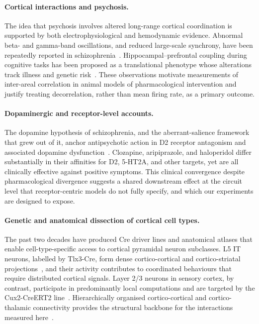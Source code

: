 \documentclass[11pt]{article}
\begin{document}
\paragraph{Cortical interactions and psychosis.}
The idea that psychosis involves altered long-range cortical coordination is supported by both electrophysiological and hemodynamic evidence. Abnormal beta- and gamma-band oscillations, and reduced large-scale synchrony, have been repeatedly reported in schizophrenia~\citep{uhlhaas2015oscillations, uhlhaas2013highfrequency}. Hippocampal--prefrontal coupling during cognitive tasks has been proposed as a translational phenotype whose alterations track illness and genetic risk~\citep{bahner2017hippocampal}. These observations motivate measurements of inter-areal correlation in animal models of pharmacological intervention and justify treating decorrelation, rather than mean firing rate, as a primary outcome.

\paragraph{Dopaminergic and receptor-level accounts.}
The dopamine hypothesis of schizophrenia, and the aberrant-salience framework that grew out of it, anchor antipsychotic action in D2 receptor antagonism and associated dopamine dysfunction~\citep{howes2009dopamine, kambeitz2014alterations}. Clozapine, aripiprazole, and haloperidol differ substantially in their affinities for D2, 5-HT2A, and other targets, yet are all clinically effective against positive symptoms. This clinical convergence despite pharmacological divergence suggests a shared downstream effect at the circuit level that receptor-centric models do not fully specify, and which our experiments are designed to expose.

\paragraph{Genetic and anatomical dissection of cortical cell types.}
The past two decades have produced Cre driver lines and anatomical atlases that enable cell-type-specific access to cortical pyramidal neuron subclasses. L5 IT neurons, labelled by Tlx3-Cre, form dense cortico-cortical and cortico-striatal projections~\citep{liu2024celltype, matho2021genetic, biccn2021multimodal, shinotsuka2023layer5, atudorei2024bilateral}, and their activity contributes to coordinated behaviours that require distributed cortical signals. Layer 2/3 neurons in sensory cortex, by contrast, participate in predominantly local computations and are targeted by the Cux2-CreERT2 line~\citep{daigle2018suite}. Hierarchically organised cortico-cortical and cortico-thalamic connectivity provides the structural backbone for the interactions measured here~\citep{harris2019hierarchical, siegle2021survey}.
\end{document}
